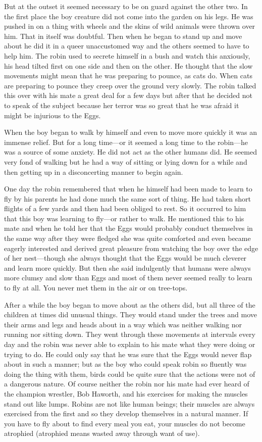 But at the outset it seemed necessary to be on guard against the other two. In the first place the boy creature did not come into the garden on his legs. He was pushed in on a thing with wheels and the skins of wild animals were thrown over him. That in itself was doubtful. Then when he began to stand up and move about he did it in a queer unaccustomed way and the others seemed to have to help him. The robin used to secrete himself in a bush and watch this anxiously, his head tilted first on one side and then on the other. He thought that the slow movements might mean that he was preparing to pounce, as cats do. When cats are preparing to pounce they creep over the ground very slowly. The robin talked this over with his mate a great deal for a few days but after that he decided not to speak of the subject because her terror was so great that he was afraid it might be injurious to the Eggs.

When the boy began to walk by himself and even to move more quickly it was an immense relief. But for a long time—or it seemed a long time to the robin—he was a source of some anxiety. He did not act as the other humans did. He seemed very fond of walking but he had a way of sitting or lying down for a while and then getting up in a disconcerting manner to begin again.

One day the robin remembered that when he himself had been made to learn to fly by his parents he had done much the same sort of thing. He had taken short flights of a few yards and then had been obliged to rest. So it occurred to him that this boy was learning to fly—or rather to walk. He mentioned this to his mate and when he told her that the Eggs would probably conduct themselves in the same way after they were fledged she was quite comforted and even became eagerly interested and derived great pleasure from watching the boy over the edge of her nest—though she always thought that the Eggs would be much cleverer and learn more quickly. But then she said indulgently that humans were always more clumsy and slow than Eggs and most of them never seemed really to learn to fly at all. You never met them in the air or on tree-tops.

After a while the boy began to move about as the others did, but all three of the children at times did unusual things. They would stand under the trees and move their arms and legs and heads about in a way which was neither walking nor running nor sitting down. They went through these movements at intervals every day and the robin was never able to explain to his mate what they were doing or trying to do. He could only say that he was sure that the Eggs would never flap about in such a manner; but as the boy who could speak robin so fluently was doing the thing with them, birds could be quite sure that the actions were not of a dangerous nature. Of course neither the robin nor his mate had ever heard of the champion wrestler, Bob Haworth, and his exercises for making the muscles stand out like lumps. Robins are not like human beings; their muscles are always exercised from the first and so they develop themselves in a natural manner. If you have to fly about to find every meal you eat, your muscles do not become atrophied (atrophied means wasted away through want of use).

